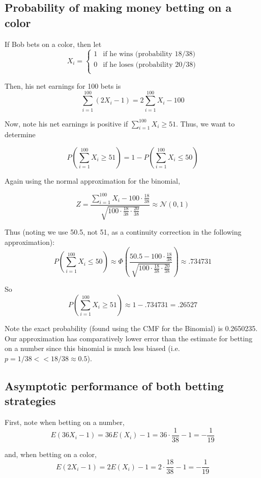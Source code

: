 \documentclass[paper=a4, fontsize=11pt]{scrartcl} %
\numberwithin{equation}{section} %
\numberwithin{figure}{section} %
\numberwithin{table}{section} %
\begin{document}
\subsection{Probability of making money betting on a color}

If Bob bets on a color, then let
\[
X_i =
\begin{cases}
  1 & \textrm{if he wins (probability 18/38)}\\
  0 & \textrm{if he loses (probability 20/38)}\\
\end{cases}
\]

Then, his net earnings for 100 bets is
\[\sum_{i = 1}^{100} \left(2X_i - 1\right) = 2 \sum_{i = 1}^{100} X_i -100\]

Now, note his net earnings is positive if $\sum_{i = 1}^{100} X_i \geq 51$. Thus, we want to determine

\[P\left(\sum_{i = 1}^{100}X_i \geq 51 \right) = 1 - P\left(\sum_{i = 1}^{100}X_i \leq 50 \right)\]

Again using the normal approximation for the binomial,

\[Z = \frac{\sum_{i = 1}^{100}X_i - 100 \cdot \frac{18}{38}}{\sqrt{100\cdot\frac{18}{38}\cdot\frac{20}{38}}} \approx \mathcal{N}(0,1)\]

Thus (noting we use 50.5, not 51, as a continuity correction in the following approximation):
\[P\left(\sum_{i = 1}^{100}X_i \leq 50 \right) \approx \Phi\left( \frac{50.5 - 100 \cdot \frac{18}{38}}{\sqrt{100\cdot\frac{18}{38}\cdot\frac{20}{38}}}\right) \approx .734731\]

So \[P\left(\sum_{i = 1}^{100}X_i \geq 51 \right) \approx 1 - .734731 = .26527\]

Note the exact probability (found using the CMF for the Binomial) is 0.2650235. Our approximation has comparatively lower error than the estimate for betting on a number since this binomial is much less biased (i.e. $p = 1/38 << 18/38 \approx 0.5$).

\subsection{Asymptotic performance of both betting strategies}

First, note when betting on a number,
\[E(36X_i -1) = 36E(X_i) -1 = 36 \cdot \frac{1}{38} - 1 = -\frac{1}{19}\]

and, when betting on a color,
\[E(2X_i -1) = 2E(X_i) -1 = 2 \cdot \frac{18}{38} - 1 = -\frac{1}{19}\]
\end{document}
